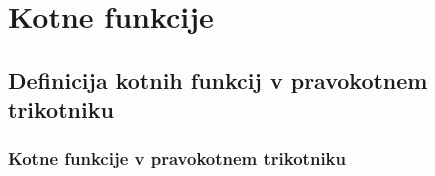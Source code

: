\chapter{Kotne funkcije}

    \section{Definicija kotnih funkcij v pravokotnem trikotniku}

        
        
            \subsection{Kotne funkcije v pravokotnem trikotniku}

                    
                    
                    
                    
                    
                    
                    
                    
